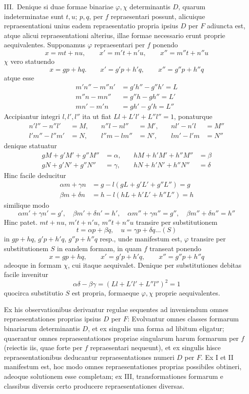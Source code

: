 III.\ Denique si duae formae binariae $\varphi,\chi$ determinantis $D$, quarum
indeterminatae sunt $t,u$; $p,q$, per $f$ repraesentari possunt, alicuique
repraesentationi unius eadem repraesentatio propria ipsius $D$ per $F$ adiuncta
est, atque alicui repraesentationi alterius, illae formae necessario erunt
proprie aequivalentes. Supponamus $\varphi$ repraesentari per $f$ ponendo
\[
x=mt+nu,\qquad x'=m't+n'u,\qquad x''=m''t+n''u
\]
$\chi$ vero statuendo
\[
x=gp+hq.\qquad x'=g'p+h'q,\qquad x''=g''p+h''q
\]
atque esse
\[
\begin{aligned}
m'n''-m''n'&=g'h''-g''h'=L\\
m''n-mn''&=g''h-gh''=L'\\
mn'-m'n&=gh'-g'h=L''
\end{aligned}
\]
Accipiantur integri $l,l',l''$ ita ut fiat $Ll+L'l'+L''l''=1$, ponaturque
\[
\begin{aligned}
n'l''-n''l'&=M,&\quad n''l-nl''&=M',&\quad nl'-n'l&=M''\\
l'm''-l''m'&=N,&\quad l''m-lm''&=N',&\quad lm'-l'm&=N''
\end{aligned}
\]
denique statuatur
\[
\begin{aligned}
gM+g'M'+g''M''&=\alpha,&\quad hM+h'M'+h''M''&=\beta\\
gN+g'N'+g''N''&=\gamma,&\quad hN+h'N'+h''N''&=\delta
\end{aligned}
\]
Hinc facile deducitur
\[
\begin{aligned}
\alpha m+\gamma n&=g-l(gL+g'L'+g''L'')=g\\
\beta m+\delta n&=h-l(hL+h'L'+h''L'')=h
\end{aligned}
\]
similique modo
\[
\alpha m'+\gamma n'=g',\quad \beta m'+\delta n'=h',\quad
\alpha m''+\gamma n''=g'',\quad \beta m''+\delta n''=h''
\]
Hinc patet. $mt+nu$, $m't+n'u$, $m''t+n''u$ transire per substitutionem
\[
t=\alpha p+\beta q,\quad u=\gamma p+\delta q\ldots(S)
\]
in $gp+hq$, $g'p+h'q$, $g''p+h''q$ resp., unde manifestum est, $\varphi$
transire per substitutionem $S$ in eandem formam, in quam $f$ transeat ponendo
\[
x=gp+hq,\qquad x'=g'p+h'q,\qquad x''=g''p+h''q
\]
adeoque in formam $\chi$, cui itaque aequivalet. Denique per substitutiones
debitas facile invenitur
\[
\alpha\delta-\beta\gamma=(Ll+L'l'+L''l'')^2=1
\]
quocirca substitutio $S$ est propria, formaeque $\varphi,\chi$ proprie aequivalentes.

Ex his observationibus derivantur regulae sequentes ad inveniendum omnes
repraesentationes proprias ipsius $D$ per $F$: Evolvantur omnes classes formarum
binariarum determinantis $D$, et ex singulis una forma ad libitum eligatur;
quaerantur omnes repraesentationes propriae singularum harum formarum per $f$
(reiectis iis, quae forte per $f$ repraesentari nequeunt), et ex singulis hisce
repraesentationibus deducantur repraesentationes numeri $D$ per $F$. Ex I et II
manifestum est, hoc modo omnes repraesentationes proprias possibiles obtineri,
adeoque solutionem esse completam; ex III, transformationes formarum e classibus
diversis certo producere repraesentationes diversas.

